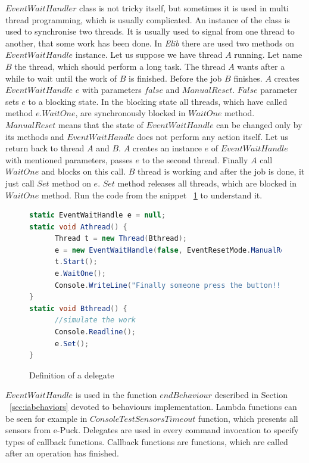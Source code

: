 \documentclass[12pt,notitlepage]{report}
\begin{document}
	$EventWaitHandler$ class is not tricky itself, but sometimes it is used in multi thread programming, which is usually complicated.
	An instance of the class is used to synchronise two threads. It is usually used to signal from one thread to another, 
	that some work has been done. In {\it Elib} there are used two methods on $EventWaitHandle$ instance.
	Let us suppose we have thread $A$ running. Let name $B$ the thread, which should perform a long task. 
	The thread $A$ wants after a while to wait until the work of $B$ is finished.
	Before the job $B$ finishes. $A$ creates $EventWaitHandle$ $e$ with parameters $false$ and $ManualReset$. 
	$False$ parameter sets $e$ to a blocking state. In the blocking state all threads, which have called method $e.WaitOne$, 
	are synchronously blocked in $WaitOne$ method. $ManualReset$ means that the state of $EventWaitHandle$ 
	can be changed only by its methods and $EventWaitHandle$ does not perform any action itself.
	Let us return back to thread $A$ and $B$. $A$ creates an instance $e$ of $EventWaitHandle$ with mentioned parameters, 
	passes $e$ to the second thread. 
	Finally $A$ call $WaitOne$ and blocks on this call.
	$B$ thread is working and after the job is done, it just call $Set$ method on $e$. 
	$Set$ method releases all threads, which are blocked in $WaitOne$ method.
	Run the code from the snippet ~\ref{ewh} to understand it.

		
\begin{figure}[!hbp]
\begin{lstlisting}[language=cs]
static EventWaitHandle e = null;
static void Athread() {
      Thread t = new Thread(Bthread);
      e = new EventWaitHandle(false, EventResetMode.ManualReset);
      t.Start();
      e.WaitOne();
      Console.WriteLine("Finally someone press the button!!!");
}
static void Bthread() {
      //simulate the work      
      Console.Readline();
      e.Set();
}
\end{lstlisting}
\caption{Definition of a delegate} \label{ewh}
\end{figure}

	 $EventWaitHandle$ is used in the function $endBehaviour$ described in Section ~\ref{sec:iabehaviors} 
	 devoted to behaviours implementation.
	 Lambda functions can be seen for example in $ConsoleTestSensorsTimeout$ function, which presents all sensors from e-Puck.
	 Delegates are used in every command invocation to specify types of callback functions.
	 Callback functions are functions, which are called after an operation has finished.
	
\end{document}
